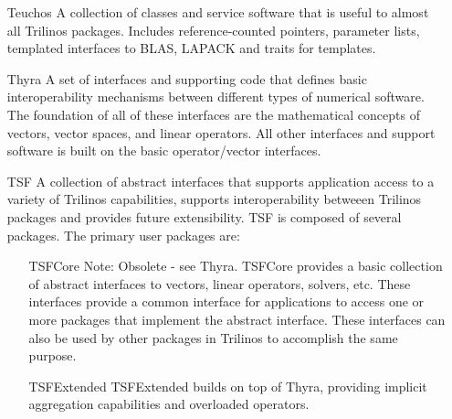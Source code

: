 \begin{itemize}
\begin{itemize}
\end{itemize}

\item[Teuchos] A collection of classes and service software that is
useful to almost all Trilinos packages.  Includes
reference-counted pointers, parameter lists, templated interfaces to
BLAS, LAPACK and traits for templates.  

\item[Thyra] A set of interfaces and supporting code that defines basic 
interoperability mechanisms between different types of numerical software. The 
foundation of all of these interfaces are the mathematical concepts of 
vectors, vector spaces, and linear operators. All other interfaces and support 
software is built on the basic operator/vector interfaces.

\item[TSF] A collection of abstract interfaces that supports application
access to a variety of Trilinos capabilities, supports
interoperability betweeen Trilinos packages and provides future extensibility.
TSF is composed of several packages.  The primary user packages are:  
\begin{itemize}

\item[TSFCore] Note: Obsolete - see Thyra.  TSFCore provides 
a basic collection of abstract interfaces to vectors, linear
operators, solvers, etc.  These interfaces provide a common
interface for applications to access one or more packages that
implement the abstract interface.  These interfaces can also be used
by other packages in Trilinos to accomplish the same purpose.

\item[TSFExtended] TSFExtended builds on top of Thyra, providing implicit
aggregation capabilities and overloaded operators.  
\end{itemize}
\end{itemize}

